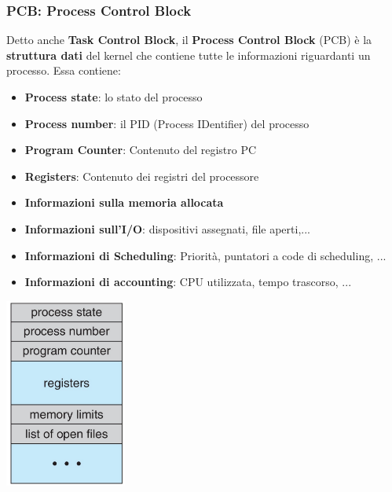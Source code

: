 \documentclass[12pt]{article}
\begin{document}
\subsubsection{PCB: Process Control Block}
Detto anche \textbf{Task Control Block}, il \textbf{Process Control Block} (PCB) è la \textbf{struttura dati} del kernel che contiene tutte le informazioni riguardanti un processo. Essa contiene:
\begin{itemize}
    \item \textbf{Process state}: lo stato del processo
    \item \textbf{Process number}: il PID (Process IDentifier) del processo
    \item \textbf{Program Counter}: Contenuto del registro PC
    \item \textbf{Registers}: Contenuto dei registri del processore
    \item \textbf{Informazioni sulla memoria allocata}
    \item \textbf{Informazioni sull'I/O}: dispositivi assegnati, file aperti,...
    \item \textbf{Informazioni di Scheduling}: Priorità, puntatori a code di scheduling, ...
    \item \textbf{Informazioni di accounting}: CPU utilizzata, tempo trascorso, ...
\end{itemize}
\begin{center}
    \includegraphics[width = 0.30\textwidth]{Images/55.PNG}
\end{center}
\end{document}
